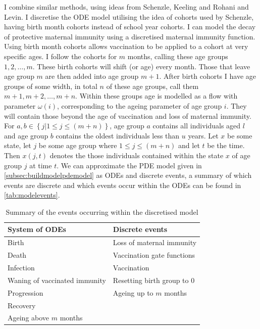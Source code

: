 \documentclass[a4paper,11pt] {scrartcl}
\begin{document}
I combine similar methods, using ideas from Schenzle\cite{schenzle1984age}, Keeling and Rohani\cite{keeling2011modeling} and Levin\cite{levin2011global}. I discretise the ODE model utilising the idea of cohorts used by Schenzle\cite{schenzle1984age}, having birth month cohorts instead of school year cohorts. I can model the decay of protective maternal immunity using a discretised maternal immunity function. Using birth month cohorts allows vaccination to be applied to a cohort at very specific ages. I follow the cohorts for $m$ months, calling these age groups $1,2, \dots ,m$. These birth cohorts will shift (or age) every month. Those that leave age group $m$ are then added into age group $m+1$. After birth cohorts I have age groups of some width, in total $n$ of these age groups, call them $m+1,m+2, \dots, m+n$. Within these groups age is modelled as a flow with parameter $\omega(i)$, corresponding to the ageing parameter of age group $i$. They will contain those beyond the age of vaccination and loss of maternal immunity. For $a,b \in \left\lbrace j | 1\leq j \leq \left(m+n\right)\right\rbrace$, age group $a$ contains all individuals aged $l$ and age group $b$ contains the oldest individuals less than $u$ years. Let $x$ be some state, let $j$ be some age group where $ 1\leq j \leq \left(m+n\right)$ and let $t$ be the time. Then $x(j,t)$ denotes the those individuals contained within the state $x$ of age group $j$ at time $t$. We can approximate the PDE model given in \autoref{subsec:buildmodelpdemodel} as ODEs and discrete events, a summary of which events are discrete and which events occur within the ODEs can be found in \autoref{tab:modelevents}.

\begin{table} [h]
\centering
\begin{tabular}{l l}
\toprule
System of ODEs & Discrete events\\
\midrule
Birth & Loss of maternal immunity\\
Death & Vaccination gate functions\\
Infection & Vaccination\\
Waning of vaccinated immunity & Resetting birth group to 0\\
Progression & Ageing up to $m$ months\\
Recovery &  \\
Ageing above $m$ months &\\
\bottomrule
\end{tabular}
\caption{Summary of the events occurring within the discretised model}
\label{tab:modelevents}
\end{table}
\end{document}
